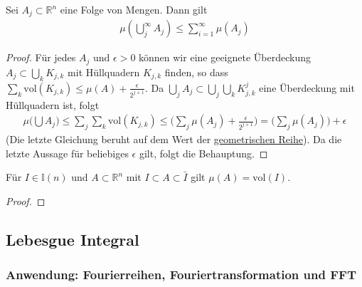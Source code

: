 \begin{Satz}
Sei $A_j \subset \mathbb{R}^n$ eine Folge von Mengen. Dann gilt
\begin{align*}
\mu (\bigcup_j^{\infty} A_j ) \leq \sum_{i=1}^{\infty} \mu(A_j)
\end{align*}
\end{Satz}
\begin{proof}
Für jedes $A_j$ und $\epsilon > 0$ können wir  eine geeignete Überdeckung  $A_j \subset \bigcup_k  K_{j,k}$ mit Hüllquadern $K_{j,k}$ finden, so dass 
 $\sum_k \text{vol} (K_{j,k}) \leq \mu(A) + \frac{\epsilon}{2^{j+1}}$.
Da $ \bigcup_j A_j \subset \bigcup_j \bigcup_k  K^j_{j,k}$ eine Überdeckung mit Hüllquadern ist, folgt
\begin{align*}
\mu \biggl (  \bigcup A_j  \biggr) \leq \sum_j \sum_k \text{vol} (K_{j,k}) \leq  \bigl( \sum_j  \mu(A_j) + \frac{\epsilon}{2^{j+1}} \bigr)  = \bigl (\sum_j \mu(A_j) \bigr ) + \epsilon
\end{align*}
(Die letzte Gleichung beruht auf dem Wert der \href{https://de.wikipedia.org/wiki/Geometrische_Reihe}{geometrischen Reihe}).
Da die letzte Aussage für beliebiges $\epsilon$ gilt, folgt die Behauptung.
\end{proof}

\begin{Satz}
Für $I \in \mathbb{I}(n)$  und $A \subset \mathbb{R}^n$ mit $I \subset A \subset \bar{I}$ gilt $\mu (A) = \text{vol}(I)$.
\end{Satz}
\begin{proof}
\end{proof}


\begin{Definition}

\end{Definition}




\subsection{Lebesgue Integral}

\subsubsection*{Anwendung: Fourierreihen, Fouriertransformation und FFT} 